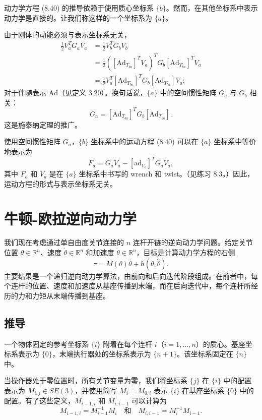 \documentclass[12pt,a4paper]{article}
\begin{document}
动力学方程 (8.40) 的推导依赖于使用质心坐标系 $\{b\}$。然而，在其他坐标系中表示动力学是直接的。让我们称这样的一个坐标系为 $\{a\}$。

由于刚体的动能必须与表示坐标系无关，
\begin{align}
\frac{1}{2}V_a^T G_a V_a &= \frac{1}{2}V_b^T G_b V_b \nonumber \\
&= \frac{1}{2}([\text{Ad}_{T_{ba}}]^T V_a)^T G_b [\text{Ad}_{T_{ba}}]^T V_a \nonumber \\
&= \frac{1}{2}V_a^T [\text{Ad}_{T_{ba}}]^T G_b [\text{Ad}_{T_{ba}}] V_a;
\end{align}
对于伴随表示 $\text{Ad}$（见定义 3.20）。换句话说，$\{a\}$ 中的空间惯性矩阵 $G_a$ 与 $G_b$ 相关：
\begin{equation}
G_a = [\text{Ad}_{T_{ba}}]^T G_b [\text{Ad}_{T_{ba}}]. \label{eq:8.42}
\end{equation}
这是施泰纳定理的推广。

使用空间惯性矩阵 $G_a$，$\{b\}$ 坐标系中的运动方程 (8.40) 可以在 $\{a\}$ 坐标系中等价地表示为
\begin{equation}
F_a = G_a \dot{V}_a - [\text{ad}_{V_a}]^T G_a V_a, \label{eq:8.43}
\end{equation}
其中 $F_a$ 和 $V_a$ 是在 $\{a\}$ 坐标系中书写的 wrench 和 twist。（见练习 8.3。）因此，运动方程的形式与表示坐标系无关。

\section{牛顿-欧拉逆向动力学}
我们现在考虑通过单自由度关节连接的 $n$ 连杆开链的逆向动力学问题。给定关节位置 $\theta \in \mathbb{R}^n$、速度 $\dot{\theta} \in \mathbb{R}^n$ 和加速度 $\ddot{\theta} \in \mathbb{R}^n$，目标是计算动力学方程的右侧
\begin{equation}
\tau = M(\theta)\ddot{\theta} + h(\theta, \dot{\theta}).
\end{equation}
主要结果是一个递归逆向动力学算法，由前向和后向迭代阶段组成。在前者中，每个连杆的位置、速度和加速度从基座传播到末端，而在后向迭代中，每个连杆所经历的力和力矩从末端传播到基座。

\subsection{推导}
一个物体固定的参考坐标系 $\{i\}$ 附着在每个连杆 $i$（$i = 1, \ldots, n$）的质心。基座坐标系表示为 $\{0\}$，末端执行器处的坐标系表示为 $\{n+1\}$。该坐标系固定在 $\{n\}$ 中。

当操作器处于零位置时，所有关节变量为零，我们将坐标系 $\{j\}$ 在 $\{i\}$ 中的配置表示为 $M_{i,j} \in SE(3)$，并使用简写 $M_i = M_{0,i}$ 表示 $\{i\}$ 在基座坐标系 $\{0\}$ 中的配置。有了这些定义，$M_{i-1,i}$ 和 $M_{i,i-1}$ 可以计算为
\begin{equation}
M_{i-1,i} = M_{i-1}^{-1}M_i \quad \text{和} \quad M_{i,i-1} = M_i^{-1}M_{i-1}.
\end{equation}
\end{document}
